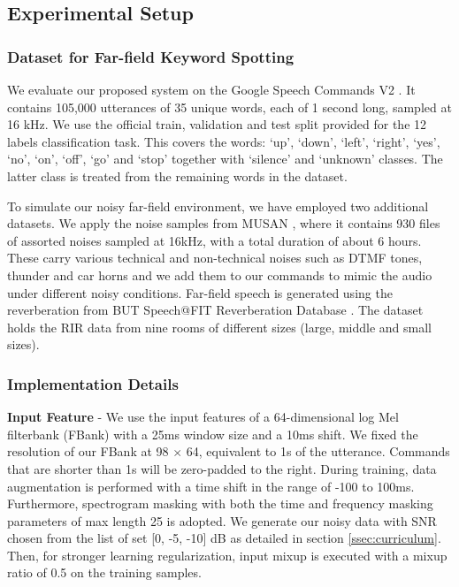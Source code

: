\documentclass{article}
\begin{document}
\subsection{Experimental Setup}
\label{ssec:setup}

\subsubsection{Dataset for Far-field Keyword Spotting}
\label{sssec: dataset}
We evaluate our proposed system on the Google Speech Commands V2 \cite{speechcommandsv2}. It contains 105,000 utterances of 35 unique words, each of 1 second long, sampled at 16 kHz. We use the official train, validation and test split provided for the 12 labels classification task. This covers the words: `up', `down', `left', `right', `yes', `no', `on', `off', `go' and `stop' together with `silence' and `unknown' classes. The latter class is treated from the remaining words in the dataset.

To simulate our noisy far-field environment, we have employed two additional datasets. We apply the noise samples from MUSAN \cite{musan}, where it contains 930 files of assorted noises sampled at 16kHz, with a total duration of about 6 hours. These carry various
technical and non-technical noises such as DTMF tones, thunder and car horns and we add them to our commands to mimic the audio under different noisy conditions. 
Far-field speech is generated using the reverberation from BUT Speech@FIT Reverberation Database \cite{RIRdata}. The dataset holds the RIR data from nine rooms of different sizes (large, middle and small sizes). 











\subsubsection{Implementation Details}
\label{sssec: preprocessing}
\textbf{Input Feature} - We use the input features of a 64-dimensional log Mel filterbank (FBank) with a 25ms window size and a 10ms shift. We fixed the resolution of our FBank at 98 $\times$ 64, equivalent to 1s of the utterance. Commands that are shorter than 1s will be zero-padded to the right. During training, data augmentation is performed with a time shift in the range of -100 to 100ms. Furthermore, spectrogram masking with both the time and frequency masking parameters of max length 25 is adopted. We generate our noisy data with SNR chosen from the list of set [0, -5, -10] dB as detailed in section \ref{ssec:curriculum}. Then, for stronger learning regularization, input mixup is executed with a mixup ratio of 0.5 on the training samples.
\end{document}
